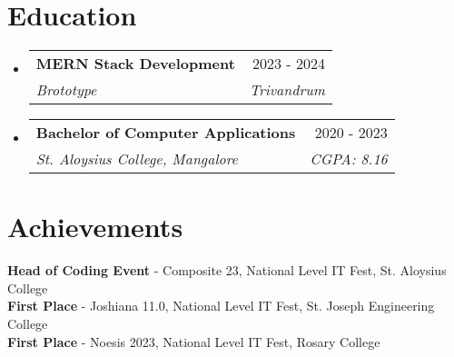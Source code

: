 \documentclass[letterpaper,11pt]{article}
\makeatletter
\newcommand{\resumeSubheading}[4]{
  \vspace{-2pt}\item
    \begin{tabular*}{0.97\textwidth}[t]{l@{\extracolsep{\fill}}r}
      \textbf{#1} & #2 \\
      \textit{\small#3} & \textit{\small #4} \\
    \end{tabular*}\vspace{-8pt}
}
\newcommand{\resumeSubHeadingListStart}{\begin{itemize}[leftmargin=0.15in, label={}]}
\newcommand{\resumeSubHeadingListEnd}{\end{itemize}\vspace{-6pt}}
\makeatother
\begin{document}
\section{Education}
\resumeSubHeadingListStart
\resumeSubheading
{MERN Stack Development}{2023 - 2024}
{Brototype}{Trivandrum}
\resumeSubheading
{Bachelor of Computer Applications}{2020 - 2023}
{St. Aloysius College, Mangalore}{CGPA: 8.16}
\resumeSubHeadingListEnd

\section{Achievements}
\begin{itemize}[leftmargin=0.15in, label={}]
    \small{\item{
     \textbf{Head of Coding Event} - Composite 23, National Level IT Fest, St. Aloysius College \\
     \textbf{First Place} - Joshiana 11.0, National Level IT Fest, St. Joseph Engineering College \\
     \textbf{First Place} - Noesis 2023, National Level IT Fest, Rosary College
    }}
\end{itemize}
\end{document}
